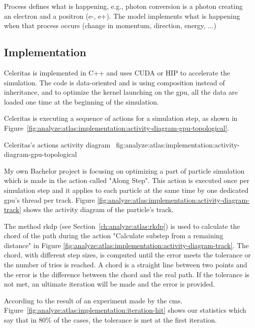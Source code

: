 Process defines what is happening, e.g., photon conversion is a photon creating
an electron and a positron (e-, e+).
The model implements what is happening when that process occurs (change in
momentum, direction, energy, ...)


\subsection{Implementation}
\label{ch:analyze:atlas:implementation}

Celeritas is implemented in C++ and uses CUDA or HIP to accelerate the
simulation.
The code is data-oriented and is using composition instead of inheritance, and
to optimize the kernel launching on the \acrshort{gpu}, all the data are loaded
one time at the beginning of the simulation.

Celeritas is executing a sequence of actions for a simulation step, as shown in
Figure~\ref{fig:analyze:atlas:implementation:activity-diagram-gpu-topological}.

{Celeritas's actions activity diagram~\cite{chep2023-presentation-johnson}}
{fig:analyze:atlas:implementation:activity-diagram-gpu-topological}

My own Bachelor project is focusing on optimizing a part of particle simulation
which is made in the action called "Along Step".
This action is executed once per simulation step and it applies to each particle
at the same time by one dedicated \acrshort{gpu}'s thread per track.
Figure \ref{fig:analyze:atlas:implementation:activity-diagram-track} shows
the activity diagram of the particle's track.

The method \acrshort{rkdp} (see Section~\ref{ch:analyze:atlas:rkdp}) is used to calculate the
chord of the path during the action "Calculate substep from a remaining distance"
in Figure \ref{fig:analyze:atlas:implementation:activity-diagram-track}.
The chord, with different step sizes, is computed until the error meets the
tolerance or the number of tries is reached.
A chord is a straight line between two points and the error is the difference
between the chord and the real path.
If the tolerance is not met, an ultimate iteration will be made and the error
is provided.

According to the result of an experiment made by the \acrfull{cms}.
Figure~\ref{fig:analyze:atlas:implementation:iteration-hit} shows our statistics
which say that in 80\% of the cases, the tolerance is met at the first
iteration.

